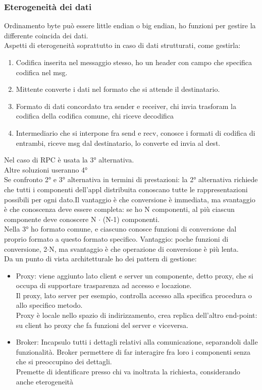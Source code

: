 \documentclass{article}
\begin{document}
\subsubsection{Eterogeneità dei dati}
Ordinamento byte può essere little endian o big endian, ho funzioni per gestire la differente coincida dei dati.\\ Aspetti di eterogeneità soprattutto in caso di dati strutturati, come gestirla:
\begin{enumerate}
\item Codifica inserita nel messaggio stesso, ho un header con campo che specifica codifica nel msg.
\item Mittente converte i dati nel formato che si attende il destinatario.
\item Formato di dati concordato tra sender e receiver, chi invia trasforam la codifica della codifica comune, chi riceve decodifica
\item Intermediario che si interpone fra send e recv, conosce i formati di codifica di entrambi, riceve msg dal destinatario, lo converte ed invia al dest.
\end{enumerate}
Nel caso di RPC è usata la 3° alternativa.\\ Altre soluzioni useranno 4°\\ Se confronto 2° e 3° alternativa in termini di prestazioni: la 2° alternativa richiede che tutti i componenti dell'appl distribuita conoscano tutte le rappresentazioni possibili per ogni dato.Il vantaggio è che conversione è immediata, ma svantaggio è che conoscenza deve essere completa: se ho N componenti, al più ciascun componente deve conoscere N $\cdot$ (N-1) componenti.\\Nella 3° ho formato comune, e ciascuno conosce funzioni di conversione dal proprio formato a questo formato specifico. Vantaggio: poche funzioni di conversione, 2$\cdot$N, ma svantaggio è che operazione di conversione è più lenta.\\ Da un punto di vista architetturale ho dei pattern di gestione:
\begin{itemize}
\item Proxy: viene aggiunto lato client e server un componente, detto proxy, che si occupa di supportare trasparenza ad accesso e locazione.\\ Il proxy, lato server per esempio, controlla accesso alla specifica procedura o allo specifico metodo.\\ Proxy è locale nello spazio di indirizzamento, crea replica dell'altro end-point: su client ho proxy che fa funzioni del server e viceversa.
\item Broker: Incapsulo tutti i dettagli relativi alla comunicazione, separandoli dalle funzionalità. Broker permettere di far interagire fra loro i componenti senza che si preoccupino dei dettagli. \\ Premette di identificare presso chi va inoltrata la richiesta, considerando anche eterogeneità
\end{itemize}
\end{document}

